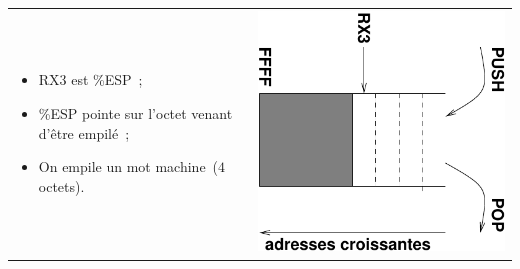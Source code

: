 \begin{frame}
  \begin{center}
    \begin{tabular}{lc}
      \begin{minipage}[b]{3.5cm}
        \begin{itemize}
        \item RX3 est \%ESP~;
        \item \%ESP pointe sur 
        l'octet venant d'\^etre 
        empil\'e~;
        \item On empile un mot machine~($4$ octets).
        \end{itemize}
      \end{minipage}
      & \includegraphics[scale=.8,angle=90]{pile} \\
    \end{tabular}
  \end{center}
\end{frame}
